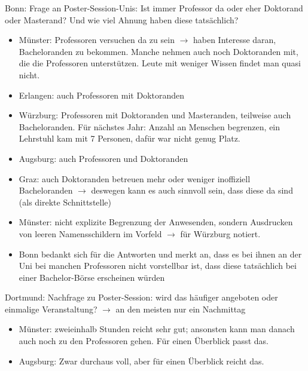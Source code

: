     Bonn: Frage an Poster-Session-Unis: Ist immer Professor da oder eher Doktorand oder Masterand? Und wie viel Ahnung haben diese tatsächlich?
    \begin{itemize}
      \item Münster: Professoren versuchen da zu sein $\rightarrow$ haben Interesse daran, Bacheloranden zu bekommen. Manche nehmen auch noch Doktoranden mit, die die Professoren unterstützen. Leute mit weniger Wissen findet man quasi nicht.
      \item Erlangen: auch Professoren mit Doktoranden
      \item Würzburg: Professoren mit Doktoranden und Masteranden, teilweise auch Bacheloranden. Für nächstes Jahr: Anzahl an Menschen begrenzen, ein Lehrstuhl kam mit 7 Personen, dafür war nicht genug Platz.
      \item Augsburg: auch Professoren und Doktoranden
      \item Graz: auch Doktoranden betreuen mehr oder weniger inoffiziell Bacheloranden $\rightarrow$ deswegen kann es auch sinnvoll sein, dass diese da sind (als direkte Schnittstelle)
      \item Münster: nicht explizite Begrenzung der Anwesenden, sondern Ausdrucken von leeren Namensschildern im Vorfeld $\rightarrow$ für Würzburg notiert.
      \item Bonn bedankt sich für die Antworten und merkt an, dass es bei ihnen an der Uni bei manchen Professoren nicht vorstellbar ist, dass diese tatsächlich bei einer Bachelor-Börse erscheinen würden

    \end{itemize}

    Dortmund: Nachfrage zu Poster-Session: wird das häufiger angeboten oder einmalige Veranstaltung?
    $\rightarrow$ an den meisten nur ein Nachmittag
    \begin{itemize}
      \item Münster: zweieinhalb Stunden reicht sehr gut; ansonsten kann man danach auch noch zu den Professoren gehen. Für einen Überblick passt das.
      \item Augsburg: Zwar durchaus voll, aber für einen Überblick reicht das.
    \end{itemize}

